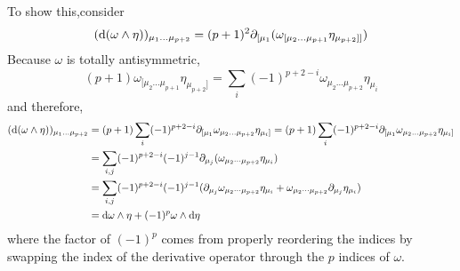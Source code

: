 \documentclass[12pt]{article}
\begin{document}
To show this,consider
\begin{align*}
(\mathrm{d} (\omega \wedge \eta))_{\mu_1 \dots \mu_{p+2}} = (p + 1)^2 \partial_{[\mu_1} (\omega_{[\mu_2 \dots \mu_{p+1}} \eta_{\mu_{p+2}]]})   
\end{align*}
Because $\omega$ is totally antisymmetric,
\[ (p + 1) \omega_{[\mu_2 \dots \mu_{p+1}} \eta_{\mu_{p+2}]} = \sum_i (-1)^{p + 2 - i} \omega_{\mu_2 \dots \mu_{p + 2}} \eta_{\mu_i} \]
and therefore,
\begin{align*}
(\mathrm{d} (\omega \wedge \eta))_{\mu_1 \dots \mu_{p+2}} & = (p + 1) \sum_i (-1)^{p + 2 - i} \partial_{[\mu_1}  \omega_{\mu_2 \dots \mu_{p + 2}} \eta_{\mu_i]} = (p + 1) \sum_i (-1)^{p + 2 - i} \partial_{[\mu_1}  \omega_{\mu_2 \dots \mu_{p + 2}} \eta_{\mu_i]}
\\
& = \sum_{i,j} (-1)^{p + 2 - i} (-1)^{j - 1} \partial_{\mu_j} (\omega_{\mu_2 \cdots \mu_{p+2}} \eta_{\mu_i}) 
\\
& = \sum_{i,j} (-1)^{p + 2 - i} (-1)^{j - 1} (\partial_{\mu_j} \omega_{\mu_2 \cdots \mu_{p+2}} \eta_{\mu_i} +  \omega_{\mu_2 \cdots \mu_{p+2}} \partial_{\mu_j} \eta_{\mu_i})
\\
& = \mathrm{d} \omega \wedge \eta + (-1)^p \omega \wedge \mathrm{d} \eta
\end{align*}
where the factor of $(-1)^p$ comes from properly reordering the indices by swapping the index of the derivative operator through the $p$ indices of $\omega$. 
\end{document}

